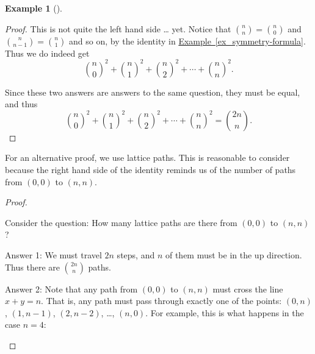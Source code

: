 \documentclass[10pt,]{book}
\theoremstyle{plain}
\theoremstyle{definition}
\newtheorem{example}[theorem]{Example}
\theoremstyle{definition}
\theoremstyle{definition}
\numberwithin{equation}{section}
\begin{document}
\begin{example}[]
\begin{proof}
            This is not quite the left hand side \dots{} yet. Notice that \({n \choose n} = {n \choose 0}\) and \({n \choose n-1} = {n  \choose 1}\) and so on, by the identity in
            \hyperref[ex_symmetry-formula]{Example~\ref{ex_symmetry-formula}}. Thus we do indeed get
            \begin{equation*}
              {n \choose 0}^2 + {n \choose 1}^2 + {n \choose 2}^2 + \cdots + {n \choose n}^2.
            \end{equation*}
\par

            Since these two answers are answers to the same question, they must be equal, and thus
            \begin{equation*}
              {n \choose 0}^2 + {n \choose 1}^2 + {n \choose 2}^2 + \cdots + {n \choose n}^2 = {2n \choose n}.
            \end{equation*}
\end{proof}
\par

          For an alternative proof, we use lattice paths. This is reasonable to consider because the right hand side of the identity reminds us of the number of paths from \((0,0)\) to \((n,n)\).
\begin{proof}\hypertarget{proof-6}{}

            Consider the question: How many lattice paths are there from \((0,0)\) to \((n,n)\)?
\par

            Answer 1: We must travel \(2n\) steps, and \(n\) of them must be in the up direction. Thus there are \({2n \choose n}\) paths.
\par

            Answer 2: Note that any path from \((0,0)\) to \((n,n)\) must cross the line \(x + y = n\). That is, any path must pass through exactly one of the points: \((0,n)\), \((1,n-1)\), \((2,n-2)\), \dots{}, \((n, 0)\). For example, this is what happens in the case \(n = 4\):
\leavevmode%
\begin{figure}
\centering
{
}
\end{figure}
\par


\end{proof}
\end{example}
\end{document}
